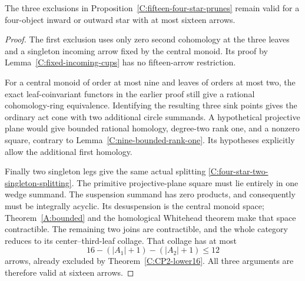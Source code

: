 \begin{proposition}
\label{C:sixteen-four-star-prunes}
The three exclusions in
Proposition~\ref{C:fifteen-four-star-prunes} remain valid for a
four-object inward or outward star with at most sixteen arrows.
\end{proposition}
\begin{proof}
The first exclusion uses only zero second cohomology at the
three leaves and a singleton incoming arrow fixed by the central
monoid.  Its proof by Lemma~\ref{C:fixed-incoming-cups} has no
fifteen-arrow restriction.

For a central monoid of order at most nine and leaves of orders
at most two, the exact leaf-coinvariant functors in the earlier
proof still give a rational cohomology-ring equivalence.  Identifying
the resulting three sink points gives the ordinary act cone with
two additional circle summands.  A hypothetical projective plane
would give bounded rational homology, degree-two rank one, and
a nonzero square, contrary to
Lemma~\ref{C:nine-bounded-rank-one}.  Its hypotheses explicitly
allow the additional first homology.

Finally two singleton legs give the same actual splitting
\eqref{C:four-star-two-singleton-splitting}.  The primitive
projective-plane square must lie entirely in one wedge summand.
The suspension summand has zero products, and consequently must
be integrally acyclic.  Its desuspension is the central monoid
space; Theorem~\ref{A:bounded} and the homological Whitehead
theorem make that space contractible.  The remaining two joins
are contractible, and the whole category reduces to its
center--third-leaf collage.  That collage has at most
\[
 16-(|A_1|+1)-(|A_2|+1)\leq12
\]
arrows, already excluded by Theorem~\ref{C:CP2-lower16}.
All three arguments are therefore valid at sixteen arrows.
\end{proof}
